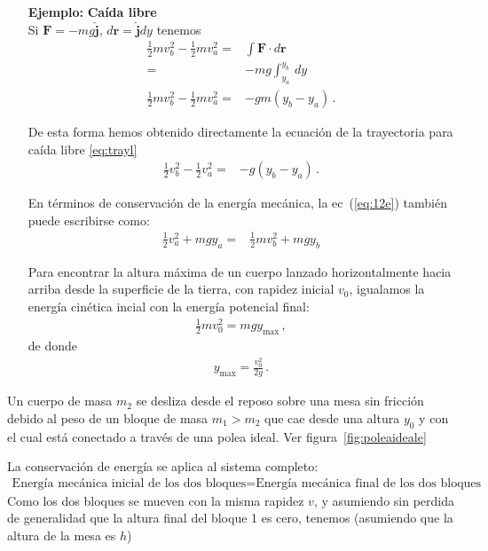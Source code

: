 \begin{itemize}
\item[\textbf{Ejemplo:}] \textbf{Caída libre}\\
Si $\mathbf{F}=-mg\hat{\mathbf{j}}$, $d\mathbf{r}=\hat{\mathbf{j}}dy$ tenemos
\begin{align}
\label{eq:12e}
  \tfrac{1}{2}mv_b^2-\tfrac{1}{2}mv_a^2=&\int\mathbf{F}\cdot d\mathbf{r}\nonumber\\
  =&-mg \int_{y_a}^{y_b}\, dy\nonumber\\
  \tfrac{1}{2}mv_b^2-\tfrac{1}{2}mv_a^2=&-gm(y_b-y_a)\,.
\end{align}

De esta forma hemos obtenido directamente la ecuación de la trayectoria para caída libre \eqref{eq:trayl}
\begin{align}
  \tfrac{1}{2}v_b^2-\tfrac{1}{2}v_a^2=&-g(y_b-y_a)\,.
\end{align}

En términos de conservación de la energía mecánica, la ec~(\ref{eq:12e}) también puede escribirse como:
\begin{align}
  \tfrac{1}{2}v_a^2+mgy_a=&\tfrac{1}{2}mv_b^2+mgy_b
\end{align}


Para encontrar la altura máxima de un cuerpo lanzado horizontalmente hacia arriba desde la superficie de la tierra, con rapidez inicial $v_0$, igualamos la energía cinética incial con la energía potencial final:
\begin{align}
  \frac{1}{2}mv_0^2=mgy_{\text{max}}\,,
\end{align}
de donde
\begin{align}
  y_{\text{max}}=\frac{v_0^2}{2g}\,.
\end{align}

\end{itemize}


\ejemplo{}
\label{ex:polea}


 Un cuerpo de masa $m_2$ se desliza desde el
  reposo sobre una mesa sin fricción debido al peso de un bloque de
  masa $m_1>m_2$ que cae desde una altura $y_0$ y con el cual está
  conectado a través de una polea ideal. Ver figura~\ref{fig:poleaideale}

La conservación de energía se aplica al sistema completo:
\begin{align}
  \text{Energía mecánica inicial de los dos bloques}=
\text{Energía mecánica final de los dos bloques}
\end{align}
Como los dos bloques se mueven con la misma rapidez $v$, y asumiendo
sin perdida de generalidad que la altura final del bloque 1 es cero,
tenemos (asumiendo que la altura de la mesa es $h$)

